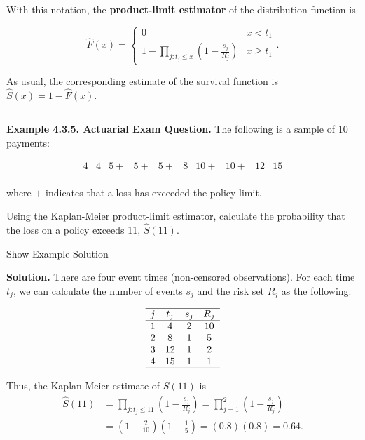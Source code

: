 \documentclass[]{book}
\theoremstyle{definition}
\theoremstyle{definition}
\theoremstyle{definition}
\theoremstyle{remark}
\begin{document}
With this notation, the \textbf{product-limit estimator} of the
distribution function is

\begin{equation}
\hat{F}(x) =
\left\{
\begin{array}{ll}
0 & x<t_{1} \\
1-\prod_{j:t_{j} \leq x}\left( 1-\frac{s_j}{R_{j}}\right) & x \geq t_{1} 
\end{array}
\right. .\label{eq:KaplanMeier}
\end{equation}

As usual, the corresponding estimate of the survival function is
\(\hat{S}(x) = 1 - \hat{F}(x)\).

\begin{center}\rule{0.5\linewidth}{\linethickness}\end{center}

\textbf{Example 4.3.5. Actuarial Exam Question.} The following is a
sample of 10 payments:

\[
\begin{array}{cccccccccc}
4 &4 &5+ &5+ &5+ &8 &10+ &10+ &12 &15 \\
\end{array}
\]

where \(+\) indicates that a loss has exceeded the policy limit.

Using the Kaplan-Meier product-limit estimator, calculate the
probability that the loss on a policy exceeds 11, \(\hat{S}(11)\).

Show Example Solution

\hypertarget{toggleExampleSelect.3.5}{}
\textbf{Solution.} There are four event times (non-censored
observations). For each time \(t_j\), we can calculate the number of
events \(s_j\) and the risk set \(R_j\) as the following:

\[
\begin{array}{cccc}
\hline
j & t_j & s_j & R_j \\
\hline
1 & 4 & 2 & 10 \\
2 & 8 & 1 & 5 \\
3 & 12 & 1 & 2 \\
4 & 15 & 1 & 1 \\
\hline
\end{array}
\]

Thus, the Kaplan-Meier estimate of \(S(11)\) is \[
\begin{aligned}
\hat{S}(11) &= \prod_{j:t_j\leq 11} \left( 1- \frac{s_j}{R_j} \right) =  \prod_{j=1}^{2} \left( 1- \frac{s_j}{R_j} \right)\\
&= \left(1-\frac{2}{10} \right) \left(1-\frac{1}{5} \right) = (0.8)(0.8)= 0.64. \\
\end{aligned}
\]
\end{document}
